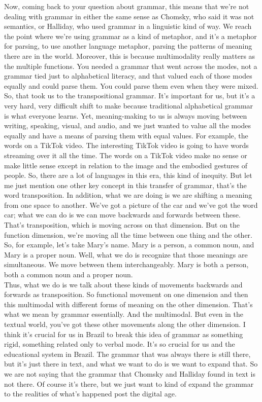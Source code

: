 \documentclass[english]{textolivre}
\begin{document}
{    Now, coming back to your question about grammar, this means that we’re not dealing with grammar in either the same sense as Chomsky, who said it was not semantics, or Halliday, who used grammar in a linguistic kind of way. We reach the point where we’re using grammar as a kind of metaphor, and it’s a metaphor for parsing, to use another language metaphor, parsing the patterns of meaning there are in the world. Moreover, this is because multimodality really matters as the multiple functions. You needed a grammar that went across the modes, not a grammar tied just to alphabetical literacy, and that valued each of those modes equally and could parse them. You could parse them even when they were mixed. So, that took us to the transpositional grammar. It’s important for us, but it’s a very hard, very difficult shift to make because traditional alphabetical grammar is what everyone learns. Yet, meaning-making to us is always moving between writing, speaking, visual, and audio, and we just wanted to value all the modes equally and have a means of parsing them with equal values. For example, the words on a TikTok video. The interesting TikTok video is going to have words streaming over it all the time. The words on a TikTok video make no sense or make little sense except in relation to the image and the embodied gestures of people. So, there are a lot of languages in this era, this kind of inequity. But let me just mention one other key concept in this transfer of grammar, that’s the word transposition. In addition, what we are doing is we are shifting a meaning from one space to another. We’ve got a picture of the car and we’ve got the word car; what we can do is we can move backwards and forwards between these. That’s transposition, which is moving across on that dimension. But on the function dimension, we’re moving all the time between one thing and the other. So, for example, let’s take Mary’s name. Mary is a person, a common noun, and Mary is a proper noun. Well, what we do is recognize that those meanings are simultaneous. We move between them interchangeably. Mary is both a person, both a common noun and a proper noun.\\
    Thus, what we do is we talk about these kinds of movements backwards and forwards as transposition. So functional movement on one dimension and then this multimodal with different forms of meaning on the other dimension. That’s what we mean by grammar essentially. And the multimodal. But even in the textual world, you’ve got these other movements along the other dimension.
    \Qu I think it’s crucial for us in Brazil to break this idea of grammar as something rigid, something related only to verbal mode. It’s so crucial for us and the educational system in Brazil.
    \An The grammar that was always there is still there, but it’s just there in text, and what we want to do is we want to expand that. So we are not saying that the grammar that Chomsky and Halliday found in text is not there. Of course it’s there, but we just want to kind of expand the grammar to the realities of what’s happened post the digital age.
}
    \begin{description}
        \interviewcontent
    \end{description}
\end{document}

